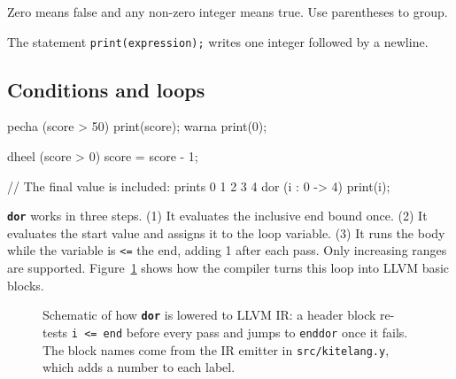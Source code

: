 \documentclass[11pt,a4paper]{article}
\newcommand{\kw}[1]{\texttt{\textcolor{cInput}{\textbf{#1}}}}
\newcommand{\fn}[1]{\texttt{#1}}
\begin{document}
Zero means false and any non-zero integer means true. Use parentheses to group.

The statement \fn{print(expression);} writes one integer followed by a newline.

\subsection{Conditions and loops}

\begin{kite}
pecha (score > 50) {
    print(score);
} warna {
    print(0);
}

dheel (score > 0) {
    score = score - 1;
}

// The final value is included: prints 0 1 2 3 4
dor (i : 0 -> 4) {
    print(i);
}
\end{kite}

\kw{dor} works in three steps. (1) It evaluates the inclusive end bound once. (2) It evaluates the start value and assigns it to the loop variable. (3) It runs the body while the variable is \fn{<=} the end, adding 1 after each pass. Only increasing ranges are supported. Figure~\ref{fig:dor} shows how the compiler turns this loop into LLVM basic blocks.

\begin{figure}[ht]
\centering
{}
\caption{Schematic of how \kw{dor} is lowered to LLVM IR: a header block re-tests \fn{i <= end} before every pass and jumps to \fn{enddor} once it fails. The block names come from the IR emitter in \fn{src/kitelang.y}, which adds a number to each label.}
\label{fig:dor}
\end{figure}
\end{document}
